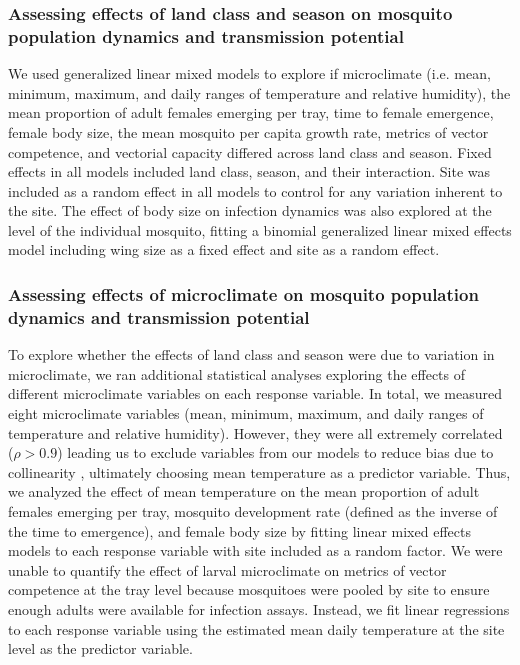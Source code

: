 \documentclass[12pt]{article}
\begin{document}
\subsubsection{Assessing effects of land class and season on mosquito population dynamics and transmission potential}

We used generalized linear mixed models to explore if microclimate (i.e. mean, minimum, maximum, and daily ranges of temperature and relative humidity), the mean proportion of adult females emerging per tray, time to female emergence, female body size, the mean mosquito per capita growth rate, metrics of vector competence, and vectorial capacity differed across land class and season. Fixed effects in all models included land class, season, and their interaction. Site was included as a random effect in all models to control for any variation inherent to the site. The effect of body size on infection dynamics was also explored at the level of the individual mosquito, fitting a binomial generalized linear mixed effects model including wing size as a fixed effect and site as a random effect.

\subsubsection{Assessing effects of microclimate on mosquito population dynamics and transmission potential}

To explore whether the effects of land class and season were due to variation in microclimate, we ran additional statistical analyses exploring the effects of different microclimate variables on each response variable. In total, we measured eight microclimate variables (mean, minimum, maximum, and daily ranges of temperature and relative humidity). However, they were all extremely correlated ($\rho>0.9$) leading us to exclude variables from our models to reduce bias due to collinearity \citep{graham2003}, ultimately choosing mean temperature as a predictor variable. Thus, we analyzed the effect of mean temperature on the mean proportion of adult females emerging per tray, mosquito development rate (defined as the inverse of the time to emergence), and female body size by fitting linear mixed effects models to each response variable with site included as a random factor. We were unable to quantify the effect of larval microclimate on metrics of vector competence at the tray level because mosquitoes were pooled by site to ensure enough adults were available for infection assays. Instead, we fit linear regressions to each response variable using the estimated mean daily temperature at the site level as the predictor variable.
\end{document}
